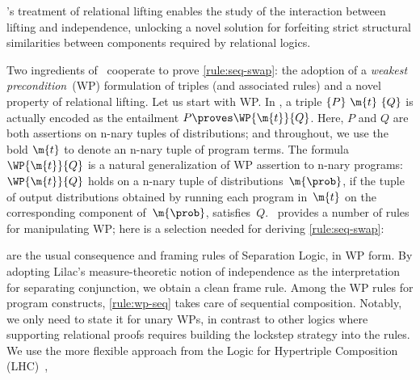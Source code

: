 \documentclass[acmsmall,nonacm,screen,appendix]{acmart}
\begin{document}
\begin{result}
\thelogic's treatment of relational lifting enables the study of the interaction
between lifting and independence,
unlocking a novel solution for forfeiting strict structural similarities between components required by relational logics.
\end{result}
Two ingredients of \thelogic\ cooperate to prove
\ref{rule:seq-swap}:
the adoption of a \emph{weakest precondition}~(WP) formulation of triples
(and associated rules)
and a novel property of relational lifting. Let us start with WP.
In \thelogic, a triple $\{P\}\ \m{t}\ \{Q\}$ is actually encoded as
the entailment
$ P \proves \WP {\m{t}} {Q} $.
Here, $P$ and $Q$ are both assertions on \pre n-nary tuples of distributions;
and throughout, we use the bold $\m{t}$ to denote an \pre n-nary
tuple of program terms.
The formula $ \WP {\m{t}} {Q}$  is a natural generalization of WP assertion to \pre n-nary programs:
$\WP {\m{t}} {Q}$
holds on
a \pre n-nary tuple of distributions~$\m{\prob}$,
if the tuple of output distributions
obtained by running each program in~$\m{t}$ on the corresponding component
of~$\m{\prob}$,
satisfies~$Q$.
\thelogic\ provides a number of rules for manipulating WP;
here is a selection needed for deriving \ref{rule:seq-swap}:
\begin{proofrules}
     \label{rule:wp-cons}

     \label{rule:wp-frame}

     \label{rule:wp-seq}

     \label{rule:wp-nest}
\end{proofrules}
 are the usual consequence and framing rules
of Separation Logic, in WP form.
By adopting Lilac's measure-theoretic notion of independence as the interpretation for separating conjunction, we obtain a clean frame rule.
Among the WP rules for program constructs,
\cref{rule:wp-seq} takes care of sequential composition.
Notably, we only need to state it for unary WPs,
in contrast to other logics where supporting relational proofs
requires building the lockstep strategy into the rules.
We use the more flexible approach from the Logic for Hypertriple Composition (LHC)~\cite{d2022proving},
\end{document}
